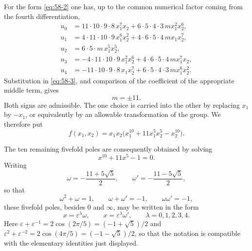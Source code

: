 \documentclass[11pt]{article}
\newcommand{\eps}{\varepsilon}
\begin{document}
For the form \eqref{eq:58-2} one has, up to the common numerical factor coming from the fourth differentiation,
\begin{align*}
 u_0&=11\cdot10\cdot9\cdot8\,x_1^7x_2+6\cdot5\cdot4\cdot3\,m x_1^2x_2^6,\\
 u_1&=4\cdot11\cdot10\cdot9\,x_1^6x_2^2+4\cdot6\cdot5\cdot4\,m x_1x_2^7,\\
 u_2&=6\cdot5\cdot m\,x_1^5x_2^5,\\
 u_3&=-4\cdot11\cdot10\cdot9\,x_1^2x_2^6+4\cdot6\cdot5\cdot4\,m x_1^7x_2,\\
 u_4&=-11\cdot10\cdot9\cdot8\,x_1x_2^7+6\cdot5\cdot4\cdot3\,m x_1^6x_2^2.
\end{align*}
Substitution in \eqref{eq:58-3}, and comparison of the coefficient of the appropriate middle term, gives
\[
 m=\pm 11.
\]
Both signs are admissible.  The one choice is carried into the other by replacing \(x_1\) by \(-x_1\), or equivalently by an allowable transformation of the group.  We therefore put
\begin{equation}\label{eq:58-4}
 f(x_1,x_2)=x_1x_2\bigl(x_1^{10}+11x_1^5x_2^5-x_2^{10}\bigr).
\end{equation}

The ten remaining fivefold poles are consequently obtained by solving
\[
 x^{10}+11x^5-1=0.
\]
Writing
\begin{equation}\label{eq:58-5}
 \omega=-\frac{11+5\sqrt5}{2}, \qquad
 \omega'=-\frac{11-5\sqrt5}{2},
\end{equation}
so that
\begin{equation}\label{eq:58-6}
 \omega^2+\omega=1,
 \qquad \omega+\omega'=-1,
 \qquad \omega\omega'=-1,
\end{equation}
these fivefold poles, besides \(0\) and \(\infty\), may be written in the form
\begin{equation}\label{eq:58-7}
 x=\eps^\lambda\omega,
 \qquad
 x=\eps^\lambda\omega',
 \qquad \lambda=0,1,2,3,4.
\end{equation}
Here \(\eps+\eps^{-1}=2\cos(2\pi/5)=(-1+\sqrt5)/2\) and \(\eps^2+\eps^{-2}=2\cos(4\pi/5)=(-1-\sqrt5)/2\), so that the notation is compatible with the elementary identities just displayed.
\end{document}
